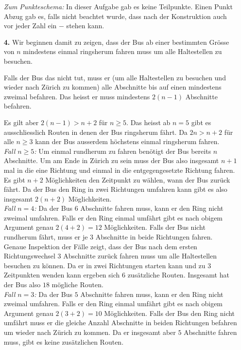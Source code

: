 \documentclass[12pt,a4paper]{article}
\theoremstyle{plain}
\theoremstyle{definition}
\theoremstyle{remark}
\begin{document}
\begin{enumerate}
\emph{Zum Punkteschema:} In dieser Aufgabe gab es keine Teilpunkte. Einen Punkt Abzug gab es, falls nicht beachtet wurde, dass nach der Konstruktion auch vor jeder Zahl ein $-$ stehen kann.\\


\bigskip


\item[\textbf{4.}]
Wir beginnen damit zu zeigen, dass der Bus ab einer bestimmten Grösse von $n$ mindestens einmal ringsherum fahren muss um alle Haltestellen zu besuchen.

Falls der Bus das nicht tut, muss er (um alle Haltestellen zu besuchen und wieder nach Zürich zu kommen) alle Abschnitte bis auf einen mindestens zweimal befahren. Das heisst er muss mindestens $2(n-1)$ Abschnitte befahren. 

Es gilt aber $2(n-1) > n+2$ für $n\geq 5$. Das heisst ab $n=5$ gibt es ausschliesslich Routen in denen der Bus ringsherum fährt. Da $2n > n+2$ für alle $n\geq 3$ kann der Bus ausserdem höchstens einmal ringsherum fahren.\\

\emph{Fall $n\geq 5$:} Um einmal rundherum zu fahren benötigt der Bus bereits $n$ Abschnitte. Um am Ende in Zürich zu sein muss der Bus also insgesamt $n+1$ mal in die eine Richtung und einmal in die entgegengesetzte Richtung fahren. Es gibt $n+2$ Möglichkeiten den Zeitpunkt zu wählen, wann der Bus zurück fährt. Da der Bus den Ring in zwei Richtungen umfahren kann gibt es also insgesamt $2(n+2)$ Möglichkeiten. \\

\emph{Fall $n=4$:} Da der Bus $6$ Abschnitte fahren muss, kann er den Ring nicht zweimal umfahren. Falls er den Ring einmal umfährt gibt es nach obigem Argument genau $2(4+2) = 12$ Möglichkeiten.
Falls der Bus nicht rundherum fährt, muss er je $3$ Abschnitte in beide Richtungen fahren. Genaue Inspektion der Fälle zeigt, dass der Bus nach dem ersten Richtungswechsel $3$ Abschnitte zurück fahren muss um alle Haltestellen besuchen zu können. Da er in zwei Richtungen starten kann und zu $3$ Zeitpunkten wenden kann ergeben sich $6$ zusätzliche Routen. Insgesamt hat der Bus also $18$ mögliche Routen. \\

\emph{Fall $n=3$:} Da der Bus $5$ Abschnitte fahren muss, kann er den Ring nicht zweimal umfahren. 
Falls er den Ring einmal umfährt gibt es nach obigem Argument genau $2(3+2) = 10$ Möglichkeiten.
Falls der Bus den Ring nicht umfährt muss er die gleiche Anzahl Abschnitte in beiden Richtungen befahren um wieder nach Zürich zu kommen. Da er insgesamt aber $5$ Abschnitte fahren muss, gibt es keine zusätzlichen Routen.\\


\end{enumerate}
\end{document}
